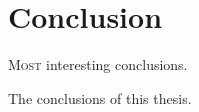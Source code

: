 \chapter{Conclusion}
\label{chp:conclusion}

\lettrine{M}{ost} interesting conclusions.

The conclusions of this thesis.

\printbibliography[heading=subbibintoc,title={References},notcategory=noprint]
